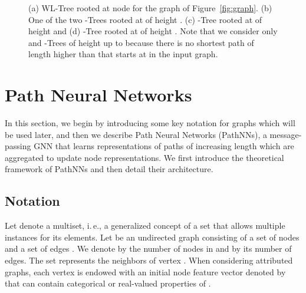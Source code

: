 \documentclass{article}
\theoremstyle{plain}
\theoremstyle{definition}
\theoremstyle{remark}
\newcommand{\ie}{i.\,e., }
\begin{document}
\begin{figure*}[t]
  \centering
  \hfil
  \hfil
  \hfil
  \caption{(a) WL-Tree rooted at node  for the graph of Figure~\ref{fig:graph}. (b) One of the two -Trees rooted at  of height . (c) -Tree rooted at  of height  and (d) -Tree rooted at  of height . Note that we consider only  and -Trees of height up to  because there is no shortest path of length higher than  that starts at  in the input graph.}
  \label{fig:trees}
\end{figure*}




\section{Path Neural Networks}
In this section, we begin by introducing some key notation for graphs which will be used later, and then we describe Path Neural Networks (PathNNs), a message-passing GNN that learns representations of paths of increasing length which are aggregated to update node representations.
We first introduce the theoretical framework of PathNNs and then detail their architecture. 

\subsection{Notation}
Let  denote a multiset, \ie a generalized concept of a set that allows multiple instances for its elements. 
Let  be an undirected graph consisting of a set of nodes  and a set of edges . We denote by  the number of nodes in  and by  its number of edges. The set  represents the neighbors of vertex . When considering attributed graphs, each vertex  is endowed with an initial node feature vector denoted by  that can contain categorical or real-valued properties of .
\end{document}
